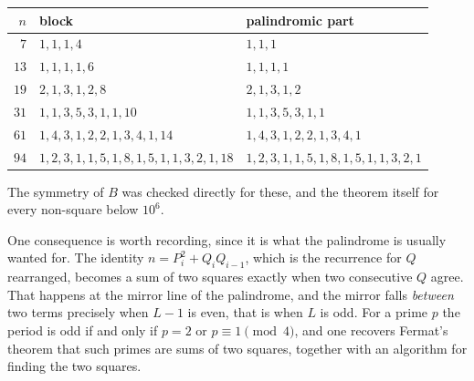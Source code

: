 \documentclass[12pt,a4paper]{article}
\theoremstyle{plain}
\theoremstyle{definition}
\begin{document}
\begin{center}
\begin{tabular}{rll}
\toprule
$n$ & block & palindromic part \\
\midrule
$7$  & $1,1,1,4$                                   & $1,1,1$ \\
$13$ & $1,1,1,1,6$                                 & $1,1,1,1$ \\
$19$ & $2,1,3,1,2,8$                               & $2,1,3,1,2$ \\
$31$ & $1,1,3,5,3,1,1,10$                          & $1,1,3,5,3,1,1$ \\
$61$ & $1,4,3,1,2,2,1,3,4,1,14$                    & $1,4,3,1,2,2,1,3,4,1$ \\
$94$ & $1,2,3,1,1,5,1,8,1,5,1,1,3,2,1,18$          & $1,2,3,1,1,5,1,8,1,5,1,1,3,2,1$ \\
\bottomrule
\end{tabular}
\end{center}

The symmetry of $B$ was checked directly for these, and the theorem itself for every non-square below $10^6$.

One consequence is worth recording, since it is what the palindrome is usually wanted for. The identity $n = P_i^2 + Q_iQ_{i-1}$, which is the recurrence for $Q$ rearranged, becomes a sum of two squares exactly when two consecutive $Q$ agree. That happens at the mirror line of the palindrome, and the mirror falls \emph{between} two terms precisely when $L-1$ is even, that is when $L$ is odd. For a prime $p$ the period is odd if and only if $p = 2$ or $p \equiv 1 \pmod 4$, and one recovers Fermat's theorem that such primes are sums of two squares, together with an algorithm for finding the two squares.
\end{document}
